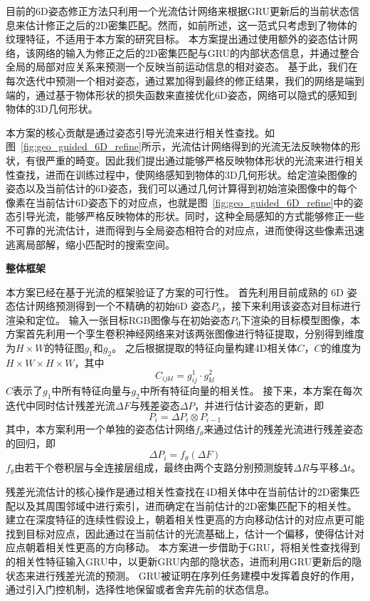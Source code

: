 \documentclass[12pt]{article}
\begin{document}
目前的6D姿态修正方法只利用一个光流估计网络来根据GRU更新后的当前状态信息来估计修正之后的2D密集匹配。然而，如前所述，这一范式只考虑到了物体的纹理特征，不适用于本方案的研究目标。
本方案提出通过使用额外的姿态估计网络，该网络的输入为修正之后的2D密集匹配与GRU的内部状态信息，并通过整合全局的局部对应关系来预测一个反映当前运动信息的相对姿态。
基于此，我们在每次迭代中预测一个相对姿态，通过累加得到最终的修正结果，我们的网络是端到端的，通过基于物体形状的损失函数来直接优化6D姿态，网络可以隐式的感知到物体的3D几何形状。


本方案的核心贡献是通过姿态引导光流来进行相关性查找。如图~\ref{fig:geo_guided_6D_refine}所示，光流估计网络得到的光流无法反映物体的形状，有很严重的畸变。因此我们提出通过能够严格反映物体形状的光流来进行相关性查找，进而在训练过程中，使网络感知到物体的3D几何形状。给定渲染图像的姿态以及当前估计的6D姿态，我们可以通过几何计算得到初始渲染图像中的每个像素在当前估计6D姿态下的对应点，也就是图~\ref{fig:geo_guided_6D_refine}中的姿态引导光流，能够严格反映物体的形状。同时，这种全局感知的方式能够修正一些不可靠的光流估计，进而得到与全局姿态相符合的对应点，进而使得这些像素迅速逃离局部解，缩小匹配时的搜索空间。

\textbf{整体框架}

本方案已经在基于光流的框架验证了方案的可行性。
首先利用目前成熟的 6D 姿态估计网络预测得到一个不精确的初始6D 姿态$P_0$，接下来利用该姿态对目标进行渲染和定位。
输入一张目标RGB图像与在初始姿态$P_0$下渲染的目标模型图像，本方案首先利用一个孪生卷积神经网络来对该两张图像进行特征提取，分别得到维度为$H\times W$的特征图$g_1$和$g_2$。
之后根据提取的特征向量构建4D相关体$C$，$C$的维度为$H\times W \times H \times W$，其中
\begin{equation}
    C_{ijkl} = g^1_{ij} \cdot g^2_{kl}
\end{equation}
$C$表示了$g_1$中所有特征向量与$g_2$中所有特征向量的相关性。
接下来，本方案在每次迭代中同时估计残差光流$\Delta F$与残差姿态$\Delta P$，并进行估计姿态的更新，即
\begin{equation}
    P_i = \Delta P_i \otimes P_{i-1}
\end{equation}
其中，本方案利用一个单独的姿态估计网络$f_{\theta}$来通过估计的残差光流进行残差姿态的回归，即
\begin{equation}
    \Delta P_i = f_{\theta}(\Delta F)
\end{equation}
$f_\theta$由若干个卷积层与全连接层组成，最终由两个支路分别预测旋转$\Delta R$与平移$\Delta t$。


残差光流估计的核心操作是通过相关性查找在4D相关体中在当前估计的2D密集匹配以及其周围邻域中进行索引，进而确定在当前估计的2D密集匹配下的相关性。
建立在深度特征的连续性假设上，朝着相关性更高的方向移动估计的对应点更可能找到目标对应点，因此通过在当前估计的光流基础上，估计一个偏移，使得估计对应点朝着相关性更高的方向移动。
本方案进一步借助于GRU，将相关性查找得到的相关性特征输入GRU中，以更新GRU内部的隐状态，进而利用GRU更新后的隐状态来进行残差光流的预测。
GRU被证明在序列任务建模中发挥着良好的作用，通过引入门控机制，选择性地保留或者舍弃先前的状态信息。
\end{document}
